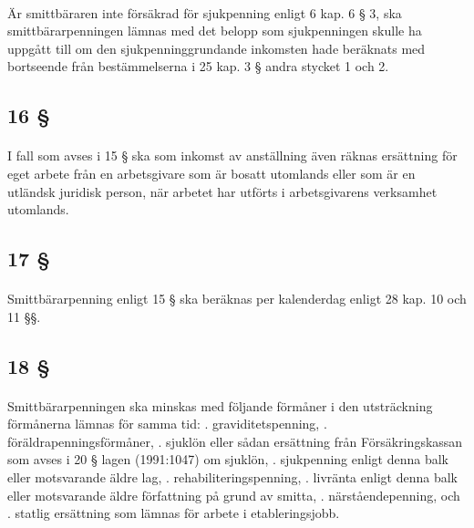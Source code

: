 \documentclass[a4paper,notitlepage,openany,10pt]{book}
\begin{document}
\paragraph*{}
Är smittbäraren inte försäkrad för sjukpenning enligt 6 kap. 6 § 3, ska smittbärarpenningen lämnas med det belopp som sjukpenningen skulle ha uppgått till om den sjukpenninggrundande inkomsten hade beräknats med bortseende från bestämmelserna i 25 kap. 3 § andra stycket 1 och 2.
\subsection*{16 §}
\paragraph*{}
I fall som avses i 15 § ska som inkomst av anställning även räknas ersättning för eget arbete från en arbetsgivare som är bosatt utomlands eller som är en utländsk juridisk person, när arbetet har utförts i arbetsgivarens verksamhet utomlands.
\subsection*{17 §}
\paragraph*{}
Smittbärarpenning enligt 15 § ska beräknas per kalenderdag enligt 28 kap. 10 och 11 §§.
\subsection*{18 §}
\paragraph*{}
Smittbärarpenningen ska minskas med följande förmåner i den utsträckning förmånerna lämnas för samma tid:
. graviditetspenning,
. föräldrapenningsförmåner,
. sjuklön eller sådan ersättning från Försäkringskassan som avses i 20 § lagen (1991:1047) om sjuklön,
. sjukpenning enligt denna balk eller motsvarande äldre lag,
. rehabiliteringspenning,
. livränta enligt denna balk eller motsvarande äldre författning på grund av smitta,
. närståendepenning, och
. statlig ersättning som lämnas för arbete i etableringsjobb.
\end{document}
